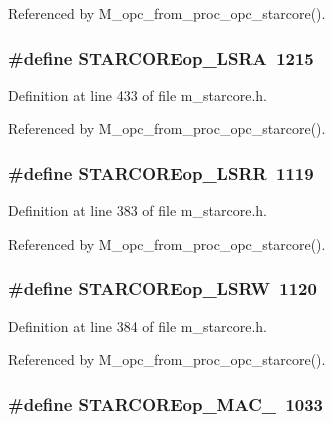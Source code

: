 Referenced by M\_\-opc\_\-from\_\-proc\_\-opc\_\-starcore().
\subsubsection{\setlength{\rightskip}{0pt plus 5cm}\#define STARCOREop\_\-LSRA~1215}\label{m__starcore_8h_00fd52040b1ab0f0c87343cd967bc178}




Definition at line 433 of file m\_\-starcore.h.

Referenced by M\_\-opc\_\-from\_\-proc\_\-opc\_\-starcore().
\subsubsection{\setlength{\rightskip}{0pt plus 5cm}\#define STARCOREop\_\-LSRR~1119}\label{m__starcore_8h_b9e2aafc95f5a18d87c540e58f4c1055}




Definition at line 383 of file m\_\-starcore.h.

Referenced by M\_\-opc\_\-from\_\-proc\_\-opc\_\-starcore().
\subsubsection{\setlength{\rightskip}{0pt plus 5cm}\#define STARCOREop\_\-LSRW~1120}\label{m__starcore_8h_91379b457270ab9a46171c0052b80e23}




Definition at line 384 of file m\_\-starcore.h.

Referenced by M\_\-opc\_\-from\_\-proc\_\-opc\_\-starcore().
\subsubsection{\setlength{\rightskip}{0pt plus 5cm}\#define STARCOREop\_\-MAC\_~1033}\label{m__starcore_8h_6b79926ac892f0f8488679d67a8f86be}





